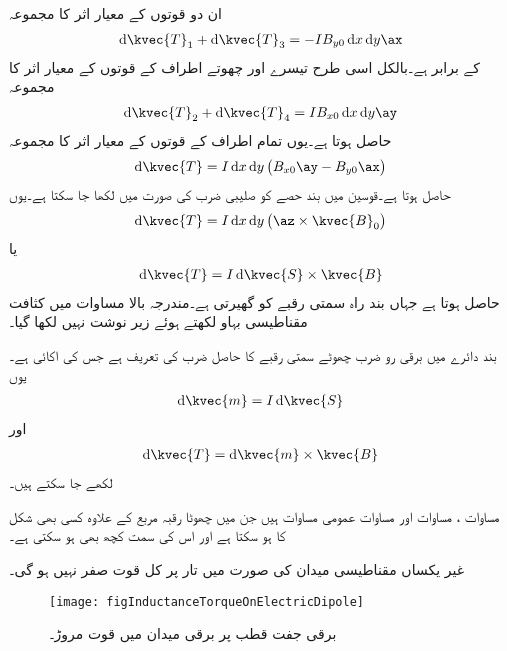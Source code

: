 ان دو قوتوں کے معیار اثر کا مجموعہ
\begin{align*}
\dif \kvec{T}_1+\dif \kvec{T}_3=-IB_{y0}\dif x \dif y\ax
\end{align*}
کے برابر ہے۔بالکل اسی طرح تیسرے اور چھوتے اطراف کے قوتوں کے معیار اثر کا مجموعہ
\begin{align*}
\dif \kvec{T}_2+\dif \kvec{T}_4=IB_{x0}\dif x \dif y\ay
\end{align*}
حاصل ہوتا ہے۔یوں تمام اطراف کے قوتوں کے معیار اثر کا مجموعہ
\begin{align*}
\dif \kvec{T}=I \dif x \dif y \left(B_{x0}\ay-B_{y0}\ax \right)
\end{align*}
حاصل ہوتا ہے۔قوسین میں بند حصے کو صلیبی ضرب کی صورت میں لکھا جا سکتا ہے۔یوں
\begin{align*}
\dif \kvec{T}=I \dif x \dif y \left(\az \times \kvec{B}_0 \right)
\end{align*}
یا
\begin{align}\label{مساوات_امالہ_تفرقی_مروڑ_عمومی}
\dif \kvec{T}=I \dif \kvec{S} \times \kvec{B}
\end{align}
حاصل ہوتا ہے جہاں بند راہ سمتی رقبے  کو گھیرتی ہے۔مندرجہ بالا مساوات میں کثافت مقناطیسی بہاو  لکھتے ہوئے زیر نوشت نہیں لکھا گیا۔

بند دائرے میں برقی رو ضرب چھوٹے سمتی رقبے  کا حاصل ضرب   کی تعریف ہے جس کی اکائی  ہے۔یوں
\begin{align}\label{مساوات-امالہ_مقناطیسی_جفت_قطب_معیار_اثر}
\dif \kvec{m}=I \dif \kvec{S}
\end{align}
اور
\begin{align}\label{مساوات_امالہ_تفرقی_مروڑ}
\dif \kvec{T} =\dif \kvec{m} \times \kvec{B}
\end{align}
لکھے جا سکتے ہیں۔

مساوات ، مساوات  اور مساوات  عمومی مساوات ہیں جن میں چھوٹا رقبہ  مربع کے علاوہ کسی بھی شکل کا ہو سکتا ہے اور اس کی سمت کچھ بھی ہو سکتی ہے۔

غیر یکساں مقناطیسی میدان کی صورت میں تار پر کل قوت صفر نہیں ہو گی۔

\begin{figure}
\centering
\texttt{[image: figInductanceTorqueOnElectricDipole]}
\caption{برقی جفت قطب پر برقی میدان میں قوت مروڑ۔}
\label{شکل_امالہ_برقی_جفت_قطب_مروڑ}
\end{figure}

